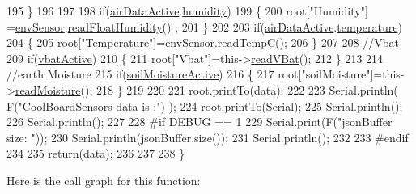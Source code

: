 \begin{DoxyCode}
195     \}
196     
197         
198     \textcolor{keywordflow}{if}(\hyperlink{class_cool_board_sensors_abff8dfeccb2f7689847bb64d5f1cd31e}{airDataActive}.\hyperlink{struct_cool_board_sensors_1_1air_active_ae5740445054b27415e22f450576accb7}{humidity}) 
199     \{   
200         root[\textcolor{stringliteral}{"Humidity"}] =\hyperlink{class_cool_board_sensors_a868e38985e9a2412829fa2790ca13e2e}{envSensor}.\hyperlink{class_b_m_e280_a42ea7232039eebf5aadb391ef6132c35}{readFloatHumidity}() ;
201     \}   
202     
203     \textcolor{keywordflow}{if}(\hyperlink{class_cool_board_sensors_abff8dfeccb2f7689847bb64d5f1cd31e}{airDataActive}.\hyperlink{struct_cool_board_sensors_1_1air_active_a9a6633c426b0508e30ebc1832ec6d745}{temperature})
204     \{
205         root[\textcolor{stringliteral}{"Temperature"}]=\hyperlink{class_cool_board_sensors_a868e38985e9a2412829fa2790ca13e2e}{envSensor}.\hyperlink{class_b_m_e280_afffdd1d7ded9e1f92200e70669019d97}{readTempC}();
206     \}
207     
208     \textcolor{comment}{//Vbat}
209     \textcolor{keywordflow}{if}(\hyperlink{class_cool_board_sensors_af5039ad760b0ff0aa7eee16c55e81702}{vbatActive})    
210     \{   
211         root[\textcolor{stringliteral}{"Vbat"}]=this->\hyperlink{class_cool_board_sensors_a6944b6ea7bce8e2fce1b434acfd9d5f3}{readVBat}();
212     \}
213     
214     \textcolor{comment}{//earth Moisture}
215     \textcolor{keywordflow}{if}(\hyperlink{class_cool_board_sensors_a31983eecc0f9cd000e1f912206ea4dc8}{soilMoistureActive})
216     \{   
217         root[\textcolor{stringliteral}{"soilMoisture"}]=this->\hyperlink{class_cool_board_sensors_a8761bff50373c485f4465c8db47d0633}{readMoisture}();
218     \}
219     
220     
221     root.printTo(data);
222 
223     Serial.println( F(\textcolor{stringliteral}{"CoolBoardSensors data is :"}) );
224     root.printTo(Serial);
225     Serial.println();
226     Serial.println();
227 
228 \textcolor{preprocessor}{#if DEBUG == 1}
229     Serial.print(F(\textcolor{stringliteral}{"jsonBuffer size: "}));
230     Serial.println(jsonBuffer.size());
231     Serial.println();
232 
233 \textcolor{preprocessor}{#endif}
234 
235     \textcolor{keywordflow}{return}(data);   
236     
237 
238 \}
\end{DoxyCode}
Here is the call graph for this function\+:\nopagebreak
